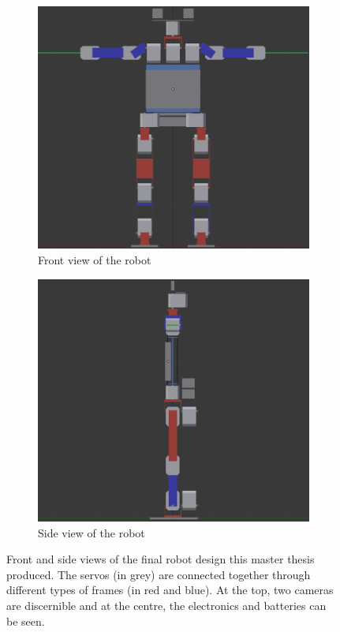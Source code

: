 \begin{figure}[htp]
\center
\begin{subfigure}[b]{0.45\textwidth}
    \includegraphics[width = \textwidth]{figures/robot_v7_front}
    \caption[]{Front view of the robot}
    \label{fig:abstract_robot1}
\end{subfigure}
\hfill
\begin{subfigure}[b]{0.45\textwidth}
\center
    \includegraphics[width = \textwidth]{figures/robot_v7_side}
    \caption[]{Side view of the robot}
    \label{fig:abstract_robot2}
\end{subfigure}
\caption[]{Front and side views of the final robot design this master thesis produced. The servos (in grey) are connected together through different types of frames (in red and blue). At the top, two cameras are discernible and at the centre, the electronics and batteries can be seen.}
\label{fig:abstract2}
\end{figure}
\clearpage

